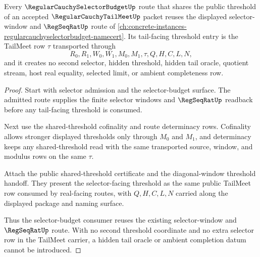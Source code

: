 \begin{theorem}
\label{thm:regular-cauchy-tail-meet-selector-budget-public-route}
Every $\RegularCauchySelectorBudgetUp$ route that shares the public threshold of an accepted $\RegularCauchyTailMeetUp$ packet reuses the displayed selector-window and $\RegSeqRatUp$ route of \autoref{ch:concrete-instances-regularcauchyselectorbudget-namecert}. Its tail-facing threshold entry is the TailMeet row $\tau$ transported through
$$
R_0,R_1,W_0,W_1,M_0,M_1,\tau,Q,H,C,L,N,
$$
and it creates no second selector, hidden threshold, hidden tail oracle, quotient stream, host real equality, selected limit, or ambient completeness row.
\end{theorem}
\begin{proof}
Start with selector admission and the selector-budget surface. The admitted route supplies the finite selector windows and $\RegSeqRatUp$ readback before any tail-facing threshold is consumed.

Next use the shared-threshold cofinality and route determinacy rows. Cofinality allows stronger displayed thresholds only through $M_0$ and $M_1$, and determinacy keeps any shared-threshold read with the same transported source, window, and modulus rows on the same $\tau$.

Attach the public shared-threshold certificate and the diagonal-window threshold handoff. They present the selector-facing threshold as the same public TailMeet row consumed by real-facing routes, with $Q,H,C,L,N$ carried along the displayed package and naming surface.

Thus the selector-budget consumer reuses the existing selector-window and $\RegSeqRatUp$ route. With no second threshold coordinate and no extra selector row in the TailMeet carrier, a hidden tail oracle or ambient completion datum cannot be introduced.
\end{proof}

